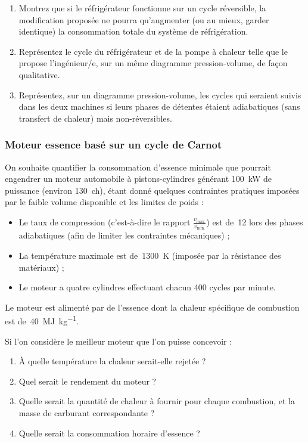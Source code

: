 		\begin{enumerate}
			\item Montrez que si le réfrigérateur fonctionne sur un cycle réversible, la modification proposée ne pourra qu’augmenter (ou au mieux, garder identique) la consommation totale du système de réfrigération.
			\item Représentez le cycle du réfrigérateur et de la pompe à chaleur telle que le propose l’ingénieur/e, sur un même diagramme pression-volume, de façon qualitative.
			\item Représentez, sur un diagramme pression-volume, les cycles qui seraient suivis dans les deux machines si leurs phases de détentes étaient adiabatiques (sans transfert de chaleur) mais non-réversibles.
		\end{enumerate}


\subsubsection{Moteur essence basé sur un cycle de Carnot}
\label{exo_carnot_quatre_cylindres}

	On souhaite quantifier la consommation d’essence minimale que pourrait engendrer un moteur automobile à pistons-cylindres générant \SI{100}{\kilo\watt} de puissance (environ \SI{130}{ch}), étant donné quelques contraintes pratiques imposées par le faible volume disponible et les limites de poids :
		
	\begin{itemize}
		\item Le taux de compression (c’est-à-dire le rapport $\frac{v_\text{max.}}{v_\text{min.}}$) est de~\num{12} lors des phases adiabatiques (afin de limiter les contraintes mécaniques) ;
		\item La température maximale est de~\SI{1300}{\kelvin} (imposée par la résistance des matériaux) ;
		\item Le moteur a quatre cylindres effectuant chacun \num{400} cycles par minute.
	\end{itemize}
	
	Le moteur est alimenté par de l’essence dont la chaleur spécifique de combustion est de~\SI{40}{\mega\joule\per\kilogram}.
	
	Si l’on considère le meilleur moteur que l’on puisse concevoir :
	
	\begin{enumerate}
		\item À quelle température la chaleur serait-elle \mbox{rejetée} ?
		\item Quel serait le rendement du moteur ?
		\item Quelle serait la quantité de chaleur à fournir pour chaque combustion, et la masse de carburant correspondante ?
		\item Quelle serait la consommation horaire d’essence ?
	\end{enumerate}

